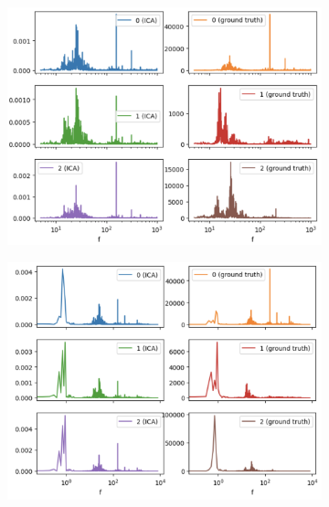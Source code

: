 \documentclass[10pt]{article}
\begin{document}
\begin{figure}[ht]
    \centering
    \hspace{-0.2in}
    \begin{subfigure}{0.4\textwidth}
        \centerline{\includegraphics[width=\textwidth]{single-sensor-ica-time-domain-phase-unaligned-without-filter-source-power-spectra}}
        \caption{\label{fig:single-sensor-ica-time-domain-phase-unaligned-without-filter-source-power-spectra-passband}}
    \end{subfigure}
    \begin{subfigure}{0.4\textwidth}
        \centerline{\includegraphics[width=\textwidth]{single-sensor-ica-time-domain-phase-unaligned-without-filter-source-power-spectra-full}}
        \caption{\label{fig:single-sensor-ica-time-domain-phase-unaligned-without-filter-source-power-spectra-full}}
    \end{subfigure}


\end{figure}
\end{document}
